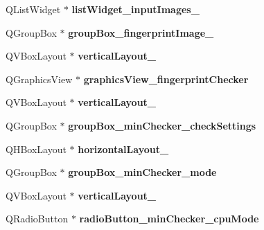 \begin{DoxyCompactItemize}
\item 
\mbox{\label{class_ui___main_window_a671bf176e7da91abb20222ebe1676705}} 
Q\+List\+Widget $\ast$ {\bfseries list\+Widget\+\_\+input\+Images\+\_}
\item 
\mbox{\label{class_ui___main_window_a5c0fd3951ea85a28e951d973c29a5ed9}} 
Q\+Group\+Box $\ast$ {\bfseries group\+Box\+\_\+fingerprint\+Image\+\_}
\item 
\mbox{\label{class_ui___main_window_afb6bb8ab195766b2b18cee42bcdc246b}} 
Q\+V\+Box\+Layout $\ast$ {\bfseries vertical\+Layout\+\_}
\item 
\mbox{\label{class_ui___main_window_af6fb088abb04c36b52ef3b6341b114f5}} 
Q\+Graphics\+View $\ast$ {\bfseries graphics\+View\+\_\+fingerprint\+Checker}
\item 
\mbox{\label{class_ui___main_window_a8e29ce9e1ff8645a366b94063232b14e}} 
Q\+V\+Box\+Layout $\ast$ {\bfseries vertical\+Layout\+\_}
\item 
\mbox{\label{class_ui___main_window_a1531919bd3c6a76bf5285414a92d2fdc}} 
Q\+Group\+Box $\ast$ {\bfseries group\+Box\+\_\+min\+Checker\+\_\+check\+Settings}
\item 
\mbox{\label{class_ui___main_window_ad07bcc9304056b61c4065a1e77ce0ba2}} 
Q\+H\+Box\+Layout $\ast$ {\bfseries horizontal\+Layout\+\_}
\item 
\mbox{\label{class_ui___main_window_ac5318b122a3354c4047346c2460251f2}} 
Q\+Group\+Box $\ast$ {\bfseries group\+Box\+\_\+min\+Checker\+\_\+mode}
\item 
\mbox{\label{class_ui___main_window_ae5f4dafa4f99b3990c864f0bc54cc87d}} 
Q\+V\+Box\+Layout $\ast$ {\bfseries vertical\+Layout\+\_}
\item 
\mbox{\label{class_ui___main_window_afda7ed0b7858b359ef0ccc243acb59d8}} 
Q\+Radio\+Button $\ast$ {\bfseries radio\+Button\+\_\+min\+Checker\+\_\+cpu\+Mode}

\end{DoxyCompactItemize}
